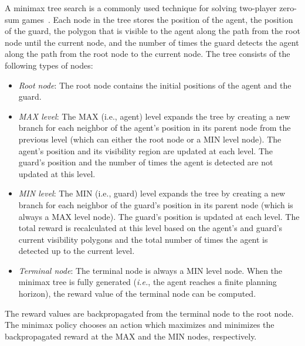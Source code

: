 \documentclass[10 pt, conference]{ieeeconf}
\newcommand{\ie}{\emph{i.e.}}
\begin{document}
A minimax tree search is a commonly used technique for solving two-player zero-sum games~\cite{russell2016artificial}. Each node in the tree stores the position of the agent, the position of the guard, the polygon that is visible to the agent along the path from the root node until the current node, and the number of times the guard detects the agent along the path from the root node to the current node. The tree consists of the following types of nodes:
\begin{itemize}
\item \emph{Root node}: The root node contains the initial positions of the agent and the guard. 
\item \emph{MAX level}: The MAX (i.e., agent) level expands the tree by creating a new branch for each neighbor of the agent's position in its parent node from the previous level (which can either the root node or a MIN level node). The agent's position and its visibility region are updated at each level. The guard's position and the number of times the agent is detected are not updated at this level.
\item \emph{MIN level}: The MIN (i.e., guard) level expands the tree by creating a new branch for each neighbor of the guard's position in its parent node (which is always a MAX level node). The guard's position is updated at each level. The total reward is recalculated at this level based on the agent's and guard's current visibility polygons and the total number of times the agent is detected up to the current level.
\item \emph{Terminal node}: The terminal node is always a MIN level node. When the minimax tree is fully generated (\ie, the agent reaches a finite planning horizon), the reward value of the terminal node can be computed. 
\end{itemize}
The reward values are backpropagated from the terminal node to the root node. The minimax policy chooses an action which maximizes and minimizes the backpropagated reward at the MAX and the MIN nodes, respectively.
\end{document}
